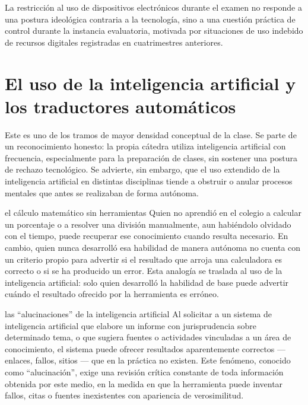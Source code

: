 \documentclass[12pt,oneside]{book}
\begin{document}
\begin{note}
La restricción al uso de dispositivos electrónicos durante el examen no responde a una postura ideológica contraria a la tecnología, sino a una cuestión práctica de control durante la instancia evaluatoria, motivada por situaciones de uso indebido de recursos digitales registradas en cuatrimestres anteriores.
\end{note}

\section{El uso de la inteligencia artificial y los traductores automáticos}

Este es uno de los tramos de mayor densidad conceptual de la clase. Se parte de un reconocimiento honesto: la propia cátedra utiliza inteligencia artificial con frecuencia, especialmente para la preparación de clases, sin sostener una postura de rechazo tecnológico. Se advierte, sin embargo, que el uso extendido de la inteligencia artificial en distintas disciplinas tiende a obstruir o anular procesos mentales que antes se realizaban de forma autónoma.

\begin{example}{el cálculo matemático sin herramientas}
Quien no aprendió en el colegio a calcular un porcentaje o a resolver una división manualmente, aun habiéndolo olvidado con el tiempo, puede recuperar ese conocimiento cuando resulta necesario. En cambio, quien nunca desarrolló esa habilidad de manera autónoma no cuenta con un criterio propio para advertir si el resultado que arroja una calculadora es correcto o si se ha producido un error. Esta analogía se traslada al uso de la inteligencia artificial: solo quien desarrolló la habilidad de base puede advertir cuándo el resultado ofrecido por la herramienta es erróneo.
\end{example}

\begin{example}{las ``alucinaciones'' de la inteligencia artificial}
Al solicitar a un sistema de inteligencia artificial que elabore un informe con jurisprudencia sobre determinado tema, o que sugiera fuentes o actividades vinculadas a un área de conocimiento, el sistema puede ofrecer resultados aparentemente correctos --- enlaces, fallos, sitios --- que en la práctica no existen. Este fenómeno, conocido como ``alucinación'', exige una revisión crítica constante de toda información obtenida por este medio, en la medida en que la herramienta puede inventar fallos, citas o fuentes inexistentes con apariencia de verosimilitud.
\end{example}
\end{document}
